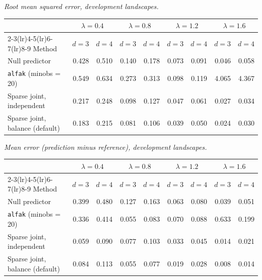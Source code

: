 \par\medskip\noindent\begin{minipage}{\linewidth}
\textit{Root mean squared error, development landscapes.}
\begin{center}
\footnotesize
\setlength{\tabcolsep}{3.5pt}
\begin{tabular}{l*{8}{r}}
\toprule
 & \multicolumn{2}{c}{$\lambda=0.4$} & \multicolumn{2}{c}{$\lambda=0.8$} & \multicolumn{2}{c}{$\lambda=1.2$} & \multicolumn{2}{c}{$\lambda=1.6$} \\
\cmidrule(lr){2-3}\cmidrule(lr){4-5}\cmidrule(lr){6-7}\cmidrule(lr){8-9}
Method & $d=3$ & $d=4$ & $d=3$ & $d=4$ & $d=3$ & $d=4$ & $d=3$ & $d=4$ \\
\midrule
Null predictor & 0.428 & 0.510 & 0.140 & 0.178 & 0.073 & 0.091 & 0.046 & 0.058 \\
\texttt{alfak} (minobs = 20) & 0.549 & 0.634 & 0.273 & 0.313 & 0.098 & 0.119 & 4.065 & 4.367 \\
Sparse joint, independent & 0.217 & 0.248 & 0.098 & 0.127 & 0.047 & 0.061 & 0.027 & 0.034 \\
Sparse joint, balance (default) & 0.183 & 0.215 & 0.081 & 0.106 & 0.039 & 0.050 & 0.024 & 0.030 \\
\bottomrule
\end{tabular}
\end{center}
\end{minipage}

\par\medskip\noindent\begin{minipage}{\linewidth}
\textit{Mean error (prediction minus reference), development landscapes.}
\begin{center}
\footnotesize
\setlength{\tabcolsep}{3.5pt}
\begin{tabular}{l*{8}{r}}
\toprule
 & \multicolumn{2}{c}{$\lambda=0.4$} & \multicolumn{2}{c}{$\lambda=0.8$} & \multicolumn{2}{c}{$\lambda=1.2$} & \multicolumn{2}{c}{$\lambda=1.6$} \\
\cmidrule(lr){2-3}\cmidrule(lr){4-5}\cmidrule(lr){6-7}\cmidrule(lr){8-9}
Method & $d=3$ & $d=4$ & $d=3$ & $d=4$ & $d=3$ & $d=4$ & $d=3$ & $d=4$ \\
\midrule
Null predictor & 0.399 & 0.480 & 0.127 & 0.163 & 0.063 & 0.080 & 0.039 & 0.051 \\
\texttt{alfak} (minobs = 20) & 0.336 & 0.414 & 0.055 & 0.083 & 0.070 & 0.088 & 0.633 & 0.199 \\
Sparse joint, independent & 0.059 & 0.090 & 0.077 & 0.103 & 0.033 & 0.045 & 0.014 & 0.021 \\
Sparse joint, balance (default) & 0.084 & 0.113 & 0.055 & 0.077 & 0.019 & 0.028 & 0.008 & 0.014 \\
\bottomrule
\end{tabular}
\end{center}
\end{minipage}

